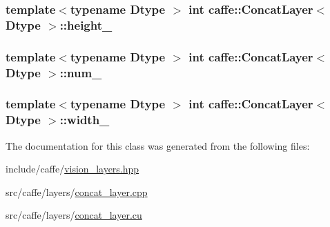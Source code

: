 \hypertarget{classcaffe_1_1_concat_layer_abef01ab0023d78b6df16a7d8e68817c0}{
\subsubsection[{height\+\_\+}]{\setlength{\rightskip}{0pt plus 5cm}template$<$typename Dtype $>$ int {\bf caffe\+::\+Concat\+Layer}$<$ Dtype $>$\+::height\+\_\+\hspace{0.3cm}{\ttfamily [protected]}}}\label{classcaffe_1_1_concat_layer_abef01ab0023d78b6df16a7d8e68817c0}
\hypertarget{classcaffe_1_1_concat_layer_a29dac7e4ccd6c477006551b591269566}{
\subsubsection[{num\+\_\+}]{\setlength{\rightskip}{0pt plus 5cm}template$<$typename Dtype $>$ int {\bf caffe\+::\+Concat\+Layer}$<$ Dtype $>$\+::num\+\_\+\hspace{0.3cm}{\ttfamily [protected]}}}\label{classcaffe_1_1_concat_layer_a29dac7e4ccd6c477006551b591269566}
\hypertarget{classcaffe_1_1_concat_layer_aae82aa5826cdd79a27c35da49728be4c}{
\subsubsection[{width\+\_\+}]{\setlength{\rightskip}{0pt plus 5cm}template$<$typename Dtype $>$ int {\bf caffe\+::\+Concat\+Layer}$<$ Dtype $>$\+::width\+\_\+\hspace{0.3cm}{\ttfamily [protected]}}}\label{classcaffe_1_1_concat_layer_aae82aa5826cdd79a27c35da49728be4c}


The documentation for this class was generated from the following files\+:\begin{DoxyCompactItemize}
\item 
include/caffe/\hyperlink{vision__layers_8hpp}{vision\+\_\+layers.\+hpp}\item 
src/caffe/layers/\hyperlink{concat__layer_8cpp}{concat\+\_\+layer.\+cpp}\item 
src/caffe/layers/\hyperlink{concat__layer_8cu}{concat\+\_\+layer.\+cu}\end{DoxyCompactItemize}
